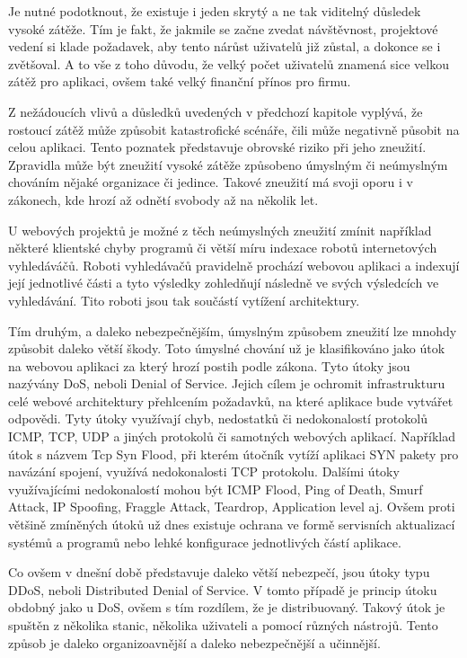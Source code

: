 \documentclass[12pt]{article}
\begin{document}
Je nutné podotknout, že existuje i jeden skrytý a ne tak viditelný důsledek vysoké zátěže. Tím je fakt, že jakmile se začne zvedat návštěvnost, projektové vedení si klade požadavek, aby tento nárůst uživatelů již zůstal, a dokonce se i zvětšoval. A to vše z toho důvodu, že velký počet uživatelů znamená sice velkou zátěž pro aplikaci, ovšem také velký finanční přínos pro firmu.



Z nežádoucích vlivů a důsledků uvedených v předchozí kapitole vyplývá, že rostoucí zátěž může způsobit katastrofické scénáře, čili může negativně působit na celou aplikaci. Tento poznatek představuje obrovské riziko při jeho zneužití. Zpravidla může být zneužití vysoké zátěže způsobeno úmyslným či neúmyslným chováním nějaké organizace či jedince. Takové zneužití má svoji oporu i v zákonech, kde hrozí až odnětí svobody až na několik let.

U webových projektů je možné z těch neúmyslných zneužití zmínit například některé klientské chyby programů či větší míru indexace robotů internetových vyhledáváčů. Roboti vyhledávačů pravidelně prochází webovou aplikaci a indexují její jednotlivé části a tyto výsledky zohledňují následně ve svých výsledcích ve vyhledávání. Tito roboti jsou tak součástí vytížení architektury.

Tím druhým, a daleko nebezpečnějším, úmyslným způsobem zneužití lze mnohdy způsobit daleko větší škody. Toto úmyslné chování už je klasifikováno jako útok na webovou aplikaci za který hrozí postih podle zákona. Tyto útoky jsou nazývány DoS, neboli Denial of Service. Jejich cílem je ochromit infrastrukturu celé webové architektury přehlcením požadavků, na které aplikace bude vytvářet odpovědi. Tyty útoky využívají chyb, nedostatků či nedokonalostí protokolů ICMP, TCP, UDP a jiných protokolů či samotných webových aplikací. Například útok s názvem Tcp Syn Flood, při kterém útočník vytíží aplikaci SYN pakety pro navázání spojení, využívá nedokonalosti TCP protokolu. Dalšími útoky využívajícími nedokonalostí mohou být ICMP Flood, Ping of Death, Smurf Attack, IP Spoofing, Fraggle Attack, Teardrop, Application level aj. Ovšem proti většině zmíněných útoků už dnes existuje ochrana ve formě servisních aktualizací systémů a programů nebo lehké konfigurace jednotlivých částí aplikace. \cite{dos}

Co ovšem v dnešní době představuje daleko větší nebezpečí, jsou útoky typu DDoS, neboli Distributed Denial of Service. V tomto případě je princip útoku obdobný jako u DoS, ovšem s tím rozdílem, že je distribuovaný. Takový útok je spuštěn z několika stanic, několika uživateli a pomocí různých nástrojů. Tento způsob je daleko organizoavnější a daleko nebezpečnější a učinnější. \cite{dos}
\end{document}
